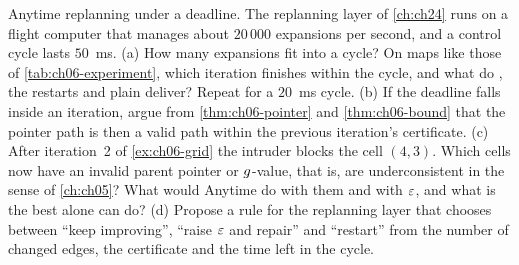 \begin{exercise}[\difficulty{3}]
\label{exr:ch06-deadline}
Anytime replanning under a deadline. The replanning layer of \cref{ch:ch24}
runs on a flight computer that manages about $20\,000$ expansions per
second, and a control cycle lasts $50$~ms. (a) How many expansions fit into a
cycle? On maps like those of \cref{tab:ch06-experiment}, which iteration
finishes within the cycle, and what do \arastar, the restarts and plain
\astar deliver? Repeat for a $20$~ms cycle. (b) If the deadline falls inside
an iteration, argue from \cref{thm:ch06-pointer} and \cref{thm:ch06-bound}
that the pointer path is then a valid path within the previous iteration's
certificate. (c) After iteration~2 of \cref{ex:ch06-grid} the intruder blocks
the cell $(4,3)$. Which cells now have an invalid parent pointer or
$g$-value, that is, are underconsistent in the sense of \cref{ch:ch05}? What would Anytime \dstar do
with them and with $\varepsilon$, and what is the best \arastar alone can do?
(d) Propose a rule for the replanning layer that chooses between
``keep improving'', ``raise $\varepsilon$ and repair'' and ``restart'' from the
number of changed edges, the certificate and the time left in the cycle.
\end{exercise}
